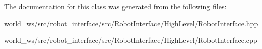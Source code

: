 The documentation for this class was generated from the following files\+:\begin{DoxyCompactItemize}
\item 
world\+\_\+ws/src/robot\+\_\+interface/src/\+Robot\+Interface/\+High\+Level/Robot\+Interface.\+hpp\item 
world\+\_\+ws/src/robot\+\_\+interface/src/\+Robot\+Interface/\+High\+Level/Robot\+Interface.\+cpp\end{DoxyCompactItemize}
